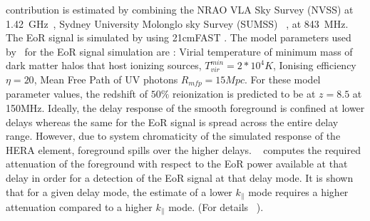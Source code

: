 \documentclass[twocolumn]{emulateapj}
\begin{document}
contribution is estimated by combining the NRAO VLA Sky Survey (NVSS) at
1.42~GHz~\citep{Condon_1998}, Sydney University Molonglo sky Survey (SUMSS)
~\citep{Bock_et_al_1999}, \citep{Mauch_et_al_2003} at 843~MHz. The EoR signal
is simulated by using 21cmFAST \citep{Messinger_et_al2011}. The model
parameters used by~\cite{Thyagarajan_et_al2016} for the EoR signal simulation
are : Virial temperature of minimum mass of dark matter halos that host
ionizing sources, $T_{vir}^{min} = 2*10^4 K$, Ionising efficiency $\eta = 20$,
Mean Free Path of UV photons $R_{mfp} = 15Mpc.$ For these model parameter
values, the redshift of $50\%$ reionization is predicted to be at $z = 8.5$ at
150MHz.  Ideally, the delay response of the smooth foreground is confined at
lower delays whereas the same for the EoR signal is spread across the entire
delay range. However, due to system chromaticity of the simulated response of
the HERA element, foreground spills over the higher delays.
~\cite{Thyagarajan_et_al2016} computes the required attenuation of the
foreground with respect to the EoR power available at that delay in order for a
detection of the EoR signal at that delay mode. It is shown that for a given
delay mode, the estimate of a lower $k_{\parallel}$ mode requires a higher
attenuation compared to a higher $k_{\parallel}$ mode. (For details
~\cite{Thyagarajan_et_al2016}). 
\end{document}
